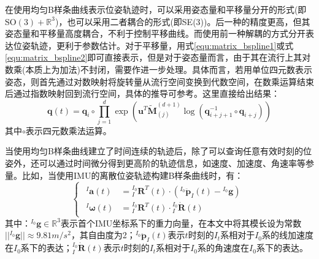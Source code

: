 在使用均匀B样条曲线表示位姿轨迹时，可以采用姿态量和平移量分开的形式(即$\mathrm{SO}(3)+\mathbb{R}^3$)，也可以采用二者耦合的形式(即SE(3))。后一种的精度更高，但其姿态量和平移量高度耦合，不利于控制平移曲线。而使用前一种解耦的方式分开表达位姿轨迹，更利于参数估计\cite{haarbach2018survey}。对于平移量，用式\ref{equ:matrix_bspline1}或式\ref{equ:matrix_bspline2}即可直接表示，但是对于姿态量而言，由于其在流行上其对数乘(本质上为加法)不封闭，需要作进一步处理\cite{高翔2017视觉}。具体而言，若用单位四元数表示姿态，则首先通过对数映射将旋转量从流行空间变换到代数空间，在数乘运算结束后通过指数映射回到流行空间，具体的推导可参考\cite{kim1995general}。这里直接给出结果：
\begin{equation}
  \boldsymbol{q}(t)=\boldsymbol{q}_i\circ \prod_{j=1}^{d}\exp\left( \boldsymbol{u}^T\tilde{\boldsymbol{M}}^{(d+1)}_{(j)}\log\left( \boldsymbol{q}_{i+j+1}^{-1}\circ \boldsymbol{q}_{i+j}\right) \right)
\end{equation}
其中$\circ$表示四元数乘法运算。

当使用均匀B样条曲线建立了时间连续的轨迹后，除了可以查询任意有效时刻的位姿外，还可以通过时间微分得到更高阶的轨迹信息，如速度、加速度、角速率等参量。比如，当使用IMU的离散位姿轨迹构建B样条曲线时，有：
\begin{equation}
  \label{equ:imu_bspline}
  \begin{cases}
    \begin{aligned}
      {^{I}\boldsymbol{a}(t)}      & ={^{I_0}_{I}\boldsymbol{R}^T(t)}\cdot({^{I_0}\ddot{\boldsymbol{p}}_I(t)}-{^{I_0}\boldsymbol{g}}) \\
      {^{I}\boldsymbol{\omega}(t)} & ={^{I_0}_{I}\boldsymbol{R}^T(t)}\cdot{^{I_0}_{I}\dot{\boldsymbol{R}}(t)}
    \end{aligned}
  \end{cases}
\end{equation}
其中：${^{I_0}\boldsymbol{g}}\in\mathbb{R}^3$表示首个IMU坐标系下的重力向量，在本文中将其模长设为常数$\vert \vert{^{I_0}\boldsymbol{g}}\vert\vert\approx 9.81m/s^2$，其自由度为2；${^{I_0}\ddot{\boldsymbol{p}}_I(t)}$表示$t$时刻的$I_t$系相对于$I_0$系的线加速度在$I_0$系下的表达；${^{I_0}_{I}\dot{\boldsymbol{R}}(t)}$表示$t$时刻的$I_t$系相对于$I_0$系的角速度在$I_0$系下的表达。

\section{}
\label{subsec:factor_graph}

